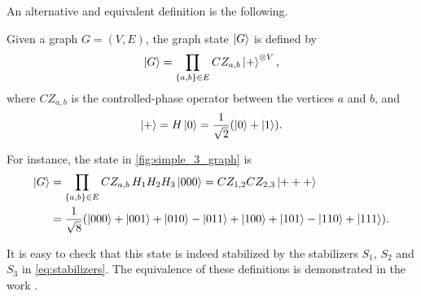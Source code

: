An alternative and equivalent definition is the following.

Given a graph $G = (V, E)$, the graph state $\ket{G}$ is defined by
\begin{equation}
    \ket{G} = \prod_{\substack{\{ a, b \} \in E}} 
    CZ_{a, b} \ket{+}^{\otimes V} ,
\end{equation}
where $CZ_{a, b}$ is the controlled-phase operator between the vertices $a$ and $b$, and 
\begin{equation}
    \ket{+} = H \ket{0} = \frac{1}{\sqrt{2}} (\ket{0} + \ket{1}) .
\end{equation}

For instance, the state in \cref{fig:simple_3_graph} is
\begin{align}
    \ket{G} &=
    \prod_{\substack{\{ a, b \} \in E}} CZ_{a,b} \, H_1 H_2 H_3 \ket{000} =
    CZ_{1, 2} CZ_{2, 3} \ket{+++} \\
    &= \frac{1}{\sqrt{8}} 
    (\ket{000} + \ket{001} + \ket{010} - \ket{011} 
    + \ket{100} + \ket{101} - \ket{110} + \ket{111}) . \notag
\end{align}

It is easy to check that this state is indeed stabilized by the stabilizers $S_1$, $S_2$ and $S_3$ in \cref{eq:stabilizers}.
The equivalence of these definitions is demonstrated in the work \cite{graph_state}.
